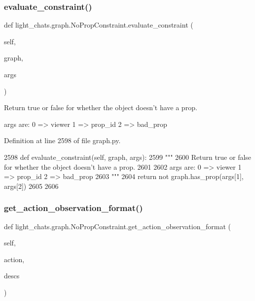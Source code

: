 \subsubsection{\texorpdfstring{evaluate\+\_\+constraint()}{evaluate\_constraint()}}
{\footnotesize\ttfamily def light\+\_\+chats.\+graph.\+No\+Prop\+Constraint.\+evaluate\+\_\+constraint (\begin{DoxyParamCaption}\item[{}]{self,  }\item[{}]{graph,  }\item[{}]{args }\end{DoxyParamCaption})}

\begin{DoxyVerb}Return true or false for whether the object doesn't have a prop.

args are:     0 => viewer     1 => prop_id     2 => bad_prop
\end{DoxyVerb}
 

Definition at line 2598 of file graph.\+py.


\begin{DoxyCode}
2598     \textcolor{keyword}{def }evaluate\_constraint(self, graph, args):
2599         \textcolor{stringliteral}{"""}
2600 \textcolor{stringliteral}{        Return true or false for whether the object doesn't have a prop.}
2601 \textcolor{stringliteral}{}
2602 \textcolor{stringliteral}{        args are:     0 => viewer     1 => prop\_id     2 => bad\_prop}
2603 \textcolor{stringliteral}{        """}
2604         \textcolor{keywordflow}{return} \textcolor{keywordflow}{not} graph.has\_prop(args[1], args[2])
2605 
2606 
\end{DoxyCode}
\mbox{\label{classlight__chats_1_1graph_1_1NoPropConstraint_a7d3ef98c6d1eea452e44c426a9498015}} 
\subsubsection{\texorpdfstring{get\+\_\+action\+\_\+observation\+\_\+format()}{get\_action\_observation\_format()}}
{\footnotesize\ttfamily def light\+\_\+chats.\+graph.\+No\+Prop\+Constraint.\+get\+\_\+action\+\_\+observation\+\_\+format (\begin{DoxyParamCaption}\item[{}]{self,  }\item[{}]{action,  }\item[{}]{descs }\end{DoxyParamCaption})}



